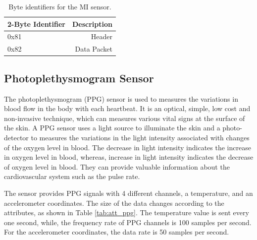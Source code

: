 \renewcommand{\arraystretch}{2}
\begin{table}
	\caption{Byte identifiers for the MI sensor.} \label{tab:bi_mi}
	
	\begin{center}
		\begin{tabular}{ | l | r | }
			\hline
			\textbf{2-Byte Identifier} & \textbf{Description} \\ \hline
			0x81  & Header \\ \hline
			0x82  & Data Packet  \\ \hline
		\end{tabular}
	\end{center}
	
\end{table}

\subsection{Photoplethysmogram Sensor}
The photoplethysmogram (PPG) sensor is used to measures the variations in blood flow in the body with each heartbeat. It is an optical, simple, low cost and non-invasive technique, which can measures various vital signs at the surface of the skin. A PPG sensor uses a light source to illuminate the skin and a photo-detector to measures the variations in the light intensity associated with changes of the oxygen level in blood. The decrease in light intensity indicates the increase in oxygen level in blood, whereas, increase in light intensity indicates the decrease of oxygen level in blood. They can provide valuable information about the cardiovascular system such as the pulse rate.

The sensor provides PPG signals with 4 different channels, a temperature, and an accelerometer coordinates. The size of the data changes according to the attributes, as shown in Table \ref{tab:att_ppg}. The temperature value is sent every one second, while, the frequency rate of PPG channels is 100 samples per second. For the accelerometer coordinates, the data rate is 50 samples per second.

